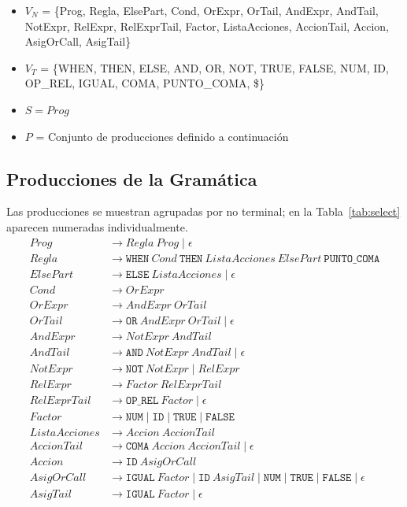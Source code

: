 \documentclass[12pt,a4paper]{article}
\begin{document}
\begin{itemize}[leftmargin=1cm]
    \item $V_N$ = \{Prog, Regla, ElsePart, Cond, OrExpr, OrTail, AndExpr, AndTail, NotExpr, RelExpr, RelExprTail, Factor, ListaAcciones, AccionTail, Accion, AsigOrCall, AsigTail\}
    \item $V_T$ = \{WHEN, THEN, ELSE, AND, OR, NOT, TRUE, FALSE, NUM, ID, OP\_REL, IGUAL, COMA, PUNTO\_COMA, \$\}
    \item $S = Prog$
    \item $P$ = Conjunto de producciones definido a continuación
\end{itemize}

\subsection{Producciones de la Gramática}
Las producciones se muestran agrupadas por no terminal; en la Tabla~\ref{tab:select} aparecen numeradas individualmente.
\begin{align*}
\mathit{Prog} &\to \mathit{Regla}\ \mathit{Prog} \mid \epsilon \\
\mathit{Regla} &\to \mathtt{WHEN}\ \mathit{Cond}\ \mathtt{THEN}\ \mathit{ListaAcciones}\ \mathit{ElsePart}\ \mathtt{PUNTO\_COMA} \\
\mathit{ElsePart} &\to \mathtt{ELSE}\ \mathit{ListaAcciones} \mid \epsilon \\
\mathit{Cond} &\to \mathit{OrExpr} \\
\mathit{OrExpr} &\to \mathit{AndExpr}\ \mathit{OrTail} \\
\mathit{OrTail} &\to \mathtt{OR}\ \mathit{AndExpr}\ \mathit{OrTail} \mid \epsilon \\
\mathit{AndExpr} &\to \mathit{NotExpr}\ \mathit{AndTail} \\
\mathit{AndTail} &\to \mathtt{AND}\ \mathit{NotExpr}\ \mathit{AndTail} \mid \epsilon \\
\mathit{NotExpr} &\to \mathtt{NOT}\ \mathit{NotExpr} \mid \mathit{RelExpr} \\
\mathit{RelExpr} &\to \mathit{Factor}\ \mathit{RelExprTail} \\
\mathit{RelExprTail} &\to \mathtt{OP\_REL}\ \mathit{Factor} \mid \epsilon \\
\mathit{Factor} &\to \mathtt{NUM} \mid \mathtt{ID} \mid \mathtt{TRUE} \mid \mathtt{FALSE} \\
\mathit{ListaAcciones} &\to \mathit{Accion}\ \mathit{AccionTail} \\
\mathit{AccionTail} &\to \mathtt{COMA}\ \mathit{Accion}\ \mathit{AccionTail} \mid \epsilon \\
\mathit{Accion} &\to \mathtt{ID}\ \mathit{AsigOrCall} \\
\mathit{AsigOrCall} &\to \mathtt{IGUAL}\ \mathit{Factor} \mid \mathtt{ID}\ \mathit{AsigTail} \mid \mathtt{NUM} \mid \mathtt{TRUE} \mid \mathtt{FALSE} \mid \epsilon \\
\mathit{AsigTail} &\to \mathtt{IGUAL}\ \mathit{Factor} \mid \epsilon
\end{align*}
\end{document}
